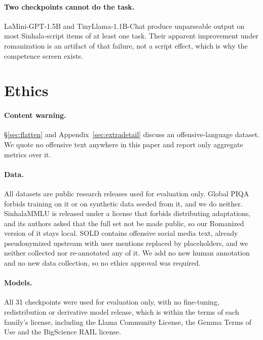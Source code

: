 \documentclass{article}
\begin{document}
\paragraph{Two checkpoints cannot do the task.} LaMini-GPT-1.5B and
TinyLlama-1.1B-Chat produce unparseable output on most Sinhala-script items of at
least one task. Their apparent improvement under romanization is an artifact of that
failure, not a script effect, which is why the competence screen exists.

\section{Ethics}
\label{sec:ethics}

\paragraph{Content warning.} \S\ref{sec:flatten} and
Appendix~\ref{sec:extradetail} discuss an offensive-language dataset. We quote no
offensive text anywhere in this paper and report only aggregate metrics over it.

\paragraph{Data.} All datasets are public research releases used for evaluation only.
Global PIQA forbids training on it or on synthetic data seeded from it, and we do
neither. SinhalaMMLU is released under a license that forbids distributing
adaptations, and its authors asked that the full set not be made public, so our
Romanized version of it stays local. SOLD contains offensive social media text,
already pseudonymized upstream with user mentions replaced by placeholders, and we
neither collected nor re-annotated any of it. We add no new human annotation and no
new data collection, so no ethics approval was required.

\paragraph{Models.} All 31 checkpoints were used for evaluation only, with no
fine-tuning, redistribution or derivative model release, which is within the terms of
each family's license, including the Llama Community License, the Gemma Terms of Use
and the BigScience RAIL license.
\end{document}
